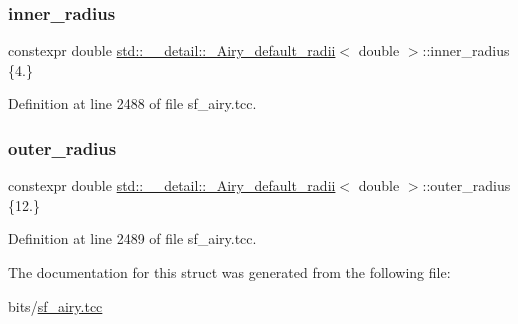 \subsubsection{\texorpdfstring{inner\+\_\+radius}{inner\_radius}}
{\footnotesize\ttfamily constexpr double \hyperlink{structstd_1_1____detail_1_1__Airy__default__radii}{std\+::\+\_\+\+\_\+detail\+::\+\_\+\+Airy\+\_\+default\+\_\+radii}$<$ double $>$\+::inner\+\_\+radius \{4.\}\hspace{0.3cm}{\ttfamily [static]}}



Definition at line 2488 of file sf\+\_\+airy.\+tcc.

\mbox{\label{structstd_1_1____detail_1_1__Airy__default__radii_3_01double_01_4_a0d0c981d84c034afb18aa533bd6a9a52}} 
\subsubsection{\texorpdfstring{outer\+\_\+radius}{outer\_radius}}
{\footnotesize\ttfamily constexpr double \hyperlink{structstd_1_1____detail_1_1__Airy__default__radii}{std\+::\+\_\+\+\_\+detail\+::\+\_\+\+Airy\+\_\+default\+\_\+radii}$<$ double $>$\+::outer\+\_\+radius \{12.\}\hspace{0.3cm}{\ttfamily [static]}}



Definition at line 2489 of file sf\+\_\+airy.\+tcc.



The documentation for this struct was generated from the following file\+:\begin{DoxyCompactItemize}
\item 
bits/\hyperlink{sf__airy_8tcc}{sf\+\_\+airy.\+tcc}\end{DoxyCompactItemize}
